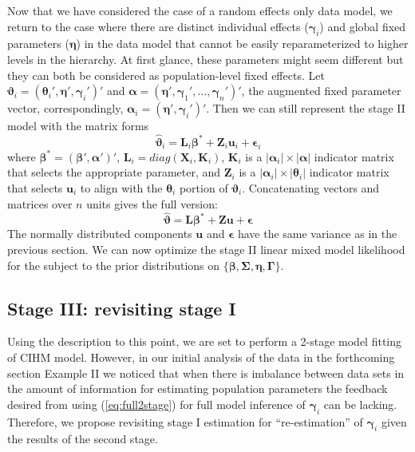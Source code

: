 \documentclass[12pt]{article}
\newcommand{\bt}{\boldsymbol{\theta}}
\newcommand{\bvt}{\boldsymbol{\vartheta}}
\newcommand{\bb}{\boldsymbol{\beta}}
\newcommand{\bn}{\boldsymbol{\eta}}
\newcommand{\bg}{\boldsymbol{\gamma}}
\newcommand{\bG}{\boldsymbol{\Gamma}}
\newcommand{\bSig}{\boldsymbol{\Sigma}}
\newcommand{\ba}{\boldsymbol{\alpha}}
\newcommand{\bL}{\mathbf{L}}
\newcommand{\bK}{\mathbf{K}}
\newcommand{\bX}{\mathbf{X}}
\newcommand{\bZ}{\mathbf{Z}}
\newcommand{\bu}{\mathbf{u}}
\begin{document}
Now that we have considered the case of a random effects only data model, we return to the case where there are distinct individual effects ($\bg_i$) and global fixed parameters ($\bn$) in the data model that cannot be easily reparameterized to higher levels in the hierarchy. At first glance, these parameters might seem different but they can both be considered as population-level fixed effects. Let $\bvt_i = (\bt_i', \bn', \bg_i')'$ and $\ba = (\bn', \bg_1',\dots,\bg_n')'$, the augmented fixed parameter vector, correspondingly, $\ba_i = (\bn', \bg_i')'$. Then we can still represent the stage II model with the matrix forms
\[
\hat{\bvt}_i = \bL_i\bb^* + \bZ_i\bu_i + \boldsymbol{\epsilon}_i
\]
where $\bb^* = (\bb', \ba')'$, $\bL_i = diag(\bX_i, \bK_i)$, $\bK_i$ is a $|\ba_i|\times |\ba|$ indicator matrix that selects the appropriate parameter, and $\bZ_i$ is a $|\ba_i|\times |\bt_i|$ indicator matrix that selects $\bu_i$ to align with the $\bt_i$ portion of $\bvt_i$. Concatenating vectors and matrices over $n$ units gives the full version:
\begin{equation}\label{eq:full2stage}
\hat{\bvt} = \bL\bb^* + \bZ\bu + \boldsymbol{\epsilon}
\end{equation}
The normally distributed components $\bu$ and $\boldsymbol{\epsilon}$ have the same variance as in the previous section. We can now optimize the stage II linear mixed model likelihood for the subject to the prior distributions on $\{\bb, \bSig, \bn, \bG\}$.   


\subsection{Stage III: revisiting stage I}  

Using the description to this point, we are set to perform a 2-stage model fitting of CIHM model. However, in our initial analysis of the data in the forthcoming section Example II we noticed that when there is imbalance between data sets in the amount of information for estimating population parameters the feedback desired from using (\ref{eq:full2stage}) for full model inference of $\bg_i$ can be lacking. Therefore, we propose revisiting stage I estimation for ``re-estimation'' of $\bg_i$ given the results of the second stage. 
\end{document}
